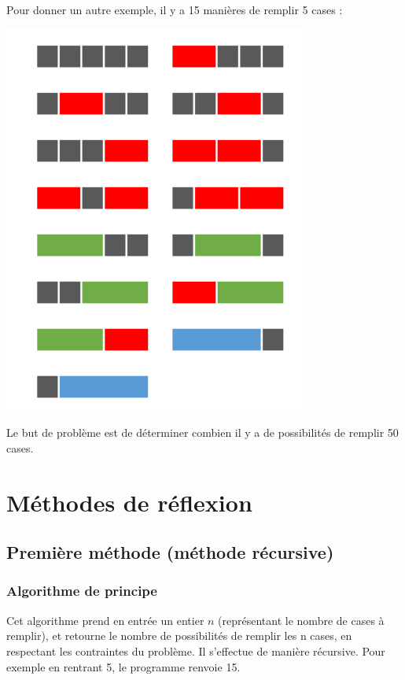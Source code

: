\documentclass{article}
\begin{document}
\newline Pour donner un autre exemple, il y a 15 manières de remplir 5 cases :
\bigbreak
\begin{center}
\includegraphics[scale = 0.5]{Images/presentation.png}
\end{center}
\bigbreak

Le but de problème est de déterminer combien il y a de possibilités de remplir 50 cases.
\newpage
\section{Méthodes de réflexion}

\subsection{Première méthode (méthode récursive)}

\subsubsection{Algorithme de principe}

Cet algorithme prend en entrée un entier $n$ (représentant le nombre de cases à remplir), et retourne le nombre de possibilités de remplir les n cases, en respectant les contraintes du problème. Il s'effectue de manière récursive. Pour exemple en rentrant 5, le programme renvoie 15.
\end{document}
